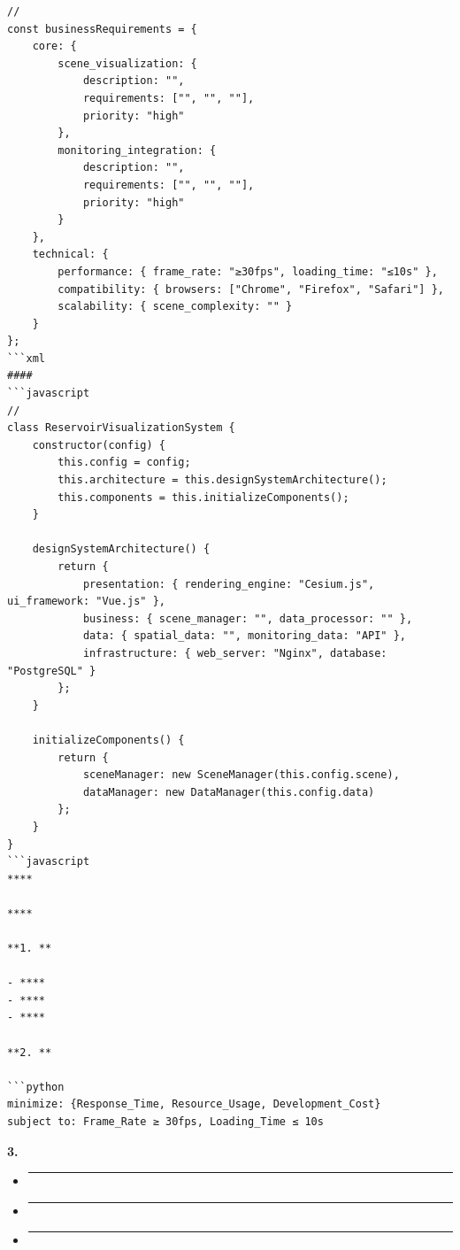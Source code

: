 \begin{verbatim}
// 
const businessRequirements = {
    core: {
        scene_visualization: {
            description: "",
            requirements: ["", "", ""],
            priority: "high"
        },
        monitoring_integration: {
            description: "", 
            requirements: ["", "", ""],
            priority: "high"
        }
    },
    technical: {
        performance: { frame_rate: "≥30fps", loading_time: "≤10s" },
        compatibility: { browsers: ["Chrome", "Firefox", "Safari"] },
        scalability: { scene_complexity: "" }
    }
};
```xml
#### 
```javascript
// 
class ReservoirVisualizationSystem {
    constructor(config) {
        this.config = config;
        this.architecture = this.designSystemArchitecture();
        this.components = this.initializeComponents();
    }
    
    designSystemArchitecture() {
        return {
            presentation: { rendering_engine: "Cesium.js", ui_framework: "Vue.js" },
            business: { scene_manager: "", data_processor: "" },
            data: { spatial_data: "", monitoring_data: "API" },
            infrastructure: { web_server: "Nginx", database: "PostgreSQL" }
        };
    }
    
    initializeComponents() {
        return {
            sceneManager: new SceneManager(this.config.scene),
            dataManager: new DataManager(this.config.data)
        };
    }
}
```javascript
****

****

**1. **

- ****
- ****
- ****

**2. **

```python
minimize: {Response_Time, Resource_Usage, Development_Cost}
subject to: Frame_Rate ≥ 30fps, Loading_Time ≤ 10s
\end{verbatim}

\textbf{3. }

\begin{itemize}
\item
  \begin{center}\rule{0.5\linewidth}{0.5pt}\end{center}
\item
  \begin{center}\rule{0.5\linewidth}{0.5pt}\end{center}
\item
  \begin{center}\rule{0.5\linewidth}{0.5pt}\end{center}
\end{itemize}


